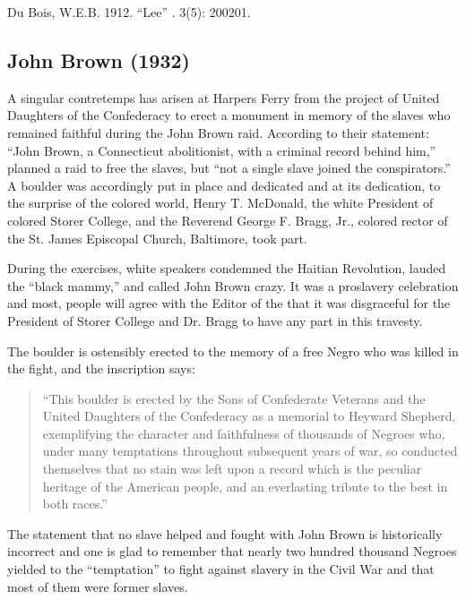 \documentclass[letterpaper,10pt,english]{jupyterBook}
\begin{document}
\sphinxAtStartPar
{} Du Bois, W.E.B. 1912. “Lee” . 3(5): 200\sphinxhyphen{}201.


\subsection{John Brown (1932)}
\label{\detokenize{Volumes/39/01/john_brown:john-brown-1932}}\label{\detokenize{Volumes/39/01/john_brown::doc}}
\sphinxAtStartPar
A singular contretemps has arisen at Harpers Ferry from the project of United Daughters of the Confederacy to erect a monument in memory of the slaves who remained faithful during the John Brown raid. According to their statement: “John Brown, a Connecticut abolitionist, with a criminal record behind him,” planned a raid to free the slaves, but “not a single slave joined the conspirators.” A boulder was accordingly put in place and dedicated and at its dedication, to the surprise of the colored world, Henry T. McDonald, the white President of colored Storer College, and the Reverend George F. Bragg, Jr., colored rector of the St. James Episcopal Church, Baltimore, took part.

\sphinxAtStartPar
During the exercises, white speakers condemned the Haitian Revolution, lauded the “black mammy,” and called John Brown crazy. It was a pro\sphinxhyphen{}slavery celebration and most, people will agree with the Editor of the  that it was disgraceful for the President of Storer College and Dr. Bragg to have any part in this travesty.

\sphinxAtStartPar
The boulder is ostensibly erected to the memory of a free Negro who was killed in the fight, and the inscription says:
\begin{quote}

\sphinxAtStartPar
“This boulder is erected by the Sons of Confederate Veterans and the United Daughters of the Confederacy as a memorial to Heyward Shepherd, exemplifying the character and faithfulness of thousands of Negroes who, under many temptations throughout subsequent years of war, so conducted themselves that no stain was left upon a record which is the peculiar heritage of the American people, and an everlasting tribute to the best in both races.”
\end{quote}

\sphinxAtStartPar
The statement that no slave helped and fought with John Brown is historically incorrect and one is glad to remember that nearly two hundred thousand Negroes yielded to the “temptation” to fight against slavery in the Civil War and that most of them were former slaves.
\end{document}
